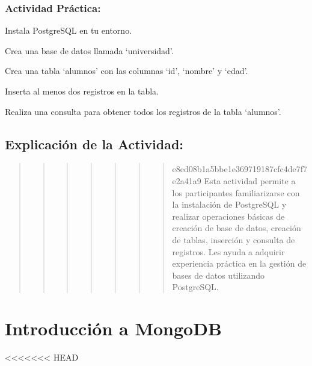 \documentclass[
  a4paper,
  onepage,
  openany]{scrreprt}
\begin{document}
\hypertarget{actividad-pruxe1ctica-61}{%
\subsection{Actividad Práctica:}\label{actividad-pruxe1ctica-61}}

Instala PostgreSQL en tu entorno.

Crea una base de datos llamada `universidad'.

Crea una tabla `alumnos' con las columnas `id', `nombre' y `edad'.

Inserta al menos dos registros en la tabla.

Realiza una consulta para obtener todos los registros de la tabla
`alumnos'.

\hypertarget{explicaciuxf3n-de-la-actividad-67}{%
\section{Explicación de la
Actividad:}\label{explicaciuxf3n-de-la-actividad-67}}

\begin{quote}
\begin{quote}
\begin{quote}
\begin{quote}
\begin{quote}
\begin{quote}
\begin{quote}
e8ed08b1a5bbe1e369719187cfc4de7f7e2a41a9 Esta actividad permite a los
participantes familiarizarse con la instalación de PostgreSQL y realizar
operaciones básicas de creación de base de datos, creación de tablas,
inserción y consulta de registros. Les ayuda a adquirir experiencia
práctica en la gestión de bases de datos utilizando PostgreSQL.
\end{quote}
\end{quote}
\end{quote}
\end{quote}
\end{quote}
\end{quote}
\end{quote}

\hypertarget{introducciuxf3n-a-mongodb}{%
\chapter{Introducción a MongoDB}\label{introducciuxf3n-a-mongodb}}

\textless\textless\textless\textless\textless\textless\textless{} HEAD
\end{document}
